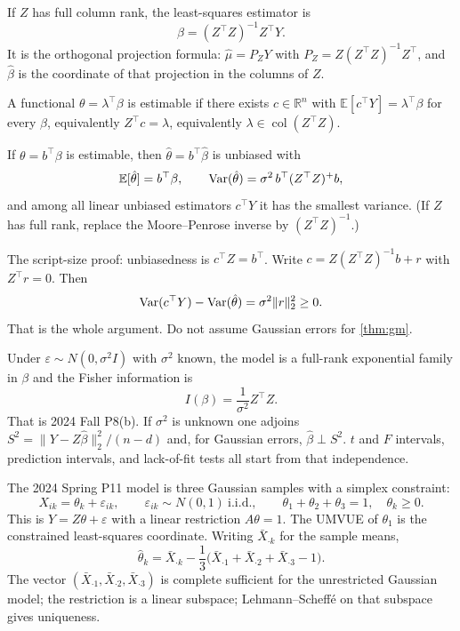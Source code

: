 If \(Z\) has full column rank, the least-squares estimator is
\[
\hat\beta=(Z^{\top}Z)^{-1}Z^{\top}Y.
\]
It is the orthogonal projection formula: \(\hat\mu=P_{Z}Y\) with \(P_{Z}=Z(Z^{\top}Z)^{-1}Z^{\top}\), and \(\hat\beta\) is the coordinate of that projection in the columns of \(Z\).

\begin{definition}[Estimability]
\label{def:estimable}
A functional \(\theta=\lambda^{\top}\beta\) is estimable if there exists \(c\in\mathbb{R}^{n}\) with \(\mathbb{E}[c^{\top}Y]=\lambda^{\top}\beta\) for every \(\beta\), equivalently \(Z^{\top}c=\lambda\), equivalently \(\lambda\in\operatorname{col}(Z^{\top}Z)\).
\end{definition}

\begin{theorem}
\label{thm:gm}
If \(\theta=b^{\top}\beta\) is estimable, then \(\hat\theta=b^{\top}\hat\beta\) is unbiased with
\[
\mathbb{E}[\hat\theta]=b^{\top}\beta,
\qquad
\Var(\hat\theta)=\sigma^{2}\,b^{\top}(Z^{\top}Z)^{+}b,
\]
and among all linear unbiased estimators \(c^{\top}Y\) it has the smallest variance. (If \(Z\) has full rank, replace the Moore--Penrose inverse by \((Z^{\top}Z)^{-1}\).)
\end{theorem}

The script-size proof: unbiasedness is \(c^{\top}Z=b^{\top}\). Write \(c=Z(Z^{\top}Z)^{-1}b+r\) with \(Z^{\top}r=0\). Then
\[
\operatorname{Var}(c^{\top}Y)-\operatorname{Var}(\hat\theta)=\sigma^{2}\|r\|_{2}^{2}\ge 0.
\]
That is the whole argument. Do not assume Gaussian errors for \cref{thm:gm}.

Under \(\varepsilon\sim N(0,\sigma^{2}I)\) with \(\sigma^{2}\) known, the model is a full-rank exponential family in \(\beta\) and the Fisher information is
\[
I(\beta)=\frac{1}{\sigma^{2}}Z^{\top}Z.
\]
That is 2024 Fall P8(b). If \(\sigma^{2}\) is unknown one adjoins \(S^{2}=\|Y-Z\hat\beta\|_{2}^{2}/(n-d)\) and, for Gaussian errors, \(\hat\beta\perp S^{2}\). \(t\) and \(F\) intervals, prediction intervals, and lack-of-fit tests all start from that independence.

\begin{definition}
\label{def:lm-con}
The 2024 Spring P11 model is three Gaussian samples with a simplex constraint:
\[
X_{ik}=\theta_{k}+\varepsilon_{ik},
\qquad
\varepsilon_{ik}\sim N(0,1)\ \mathrm{i.i.d.},
\qquad
\theta_{1}+\theta_{2}+\theta_{3}=1,\quad \theta_{k}\ge 0.
\]
This is \(Y=Z\theta+\varepsilon\) with a linear restriction \(A\theta=1\). The UMVUE of \(\theta_{1}\) is the constrained least-squares coordinate. Writing \(\bar X_{\cdot k}\) for the sample means,
\[
\hat\theta_{k}
=
\bar X_{\cdot k}-\frac13\bigl(\bar X_{\cdot 1}+\bar X_{\cdot 2}+\bar X_{\cdot 3}-1\bigr).
\]
The vector \((\bar X_{\cdot 1},\bar X_{\cdot 2},\bar X_{\cdot 3})\) is complete sufficient for the unrestricted Gaussian model; the restriction is a linear subspace; Lehmann--Scheffé on that subspace gives uniqueness.
\end{definition}

